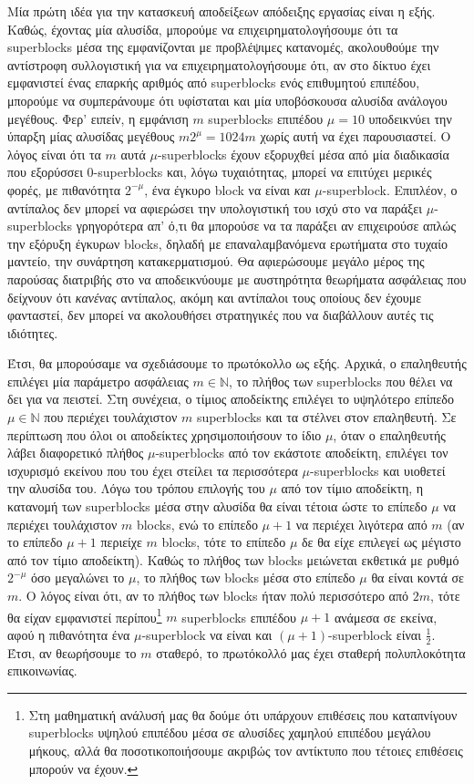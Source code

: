 Μία πρώτη ιδέα για την κατασκευή αποδείξεων απόδειξης εργασίας είναι η εξής. Καθώς, έχοντας μία αλυσίδα,
μπορούμε να επιχειρηματολογήσουμε ότι τα superblocks μέσα της εμφανίζονται με προβλέψιμες κατανομές,
ακολουθούμε την αντίστροφη συλλογιστική για να επιχειρηματολογήσουμε ότι, αν στο δίκτυο έχει εμφανιστεί
ένας επαρκής αριθμός από superblocks ενός επιθυμητού επιπέδου, μπορούμε να συμπεράνουμε ότι υφίσταται
και μία υποβόσκουσα αλυσίδα ανάλογου μεγέθους. Φερ' ειπείν, η εμφάνιση $m$ superblocks επιπέδου $\mu = 10$
υποδεικνύει την ύπαρξη μίας αλυσίδας μεγέθους $m 2^\mu = 1024m$ χωρίς αυτή να έχει παρουσιαστεί. Ο λόγος είναι ότι
τα $m$ αυτά $\mu$-superblocks έχουν εξορυχθεί μέσα από μία διαδικασία που εξορύσσει $0$-superblocks και,
λόγω τυχαιότητας, μπορεί να επιτύχει μερικές φορές, με πιθανότητα $2^{-\mu}$, ένα έγκυρο block να είναι \emph{και}
$\mu$-superblock. Επιπλέον, ο αντίπαλος δεν μπορεί να αφιερώσει την υπολογιστική του ισχύ στο να παράξει
$\mu$-superblocks γρηγορότερα απ' ό,τι θα μπορούσε να τα παράξει αν επιχειρούσε απλώς την εξόρυξη έγκυρων
blocks, δηλαδή με επαναλαμβανόμενα ερωτήματα στο τυχαίο μαντείο, την συνάρτηση κατακερματισμού. Θα
αφιερώσουμε μεγάλο μέρος της παρούσας διατριβής στο να αποδεικνύουμε με αυστηρότητα θεωρήματα ασφάλειας που δείχνουν
ότι \emph{κανένας} αντίπαλος, ακόμη και αντίπαλοι τους οποίους δεν έχουμε φανταστεί, δεν μπορεί να
ακολουθήσει στρατηγικές που να διαβάλλουν αυτές τις ιδιότητες.

Έτσι, θα μπορούσαμε να σχεδιάσουμε το πρωτόκολλο ως εξής. Αρχικά, ο επαληθευτής επιλέγει μία παράμετρο
ασφάλειας $m \in \mathbb{N}$, το πλήθος των superblocks που θέλει να δει για να πειστεί. Στη συνέχεια,
ο τίμιος αποδείκτης επιλέγει το υψηλότερο επίπεδο $\mu \in \mathbb{N}$ που περιέχει τουλάχιστον $m$
superblocks και τα στέλνει στον επαληθευτή. Σε περίπτωση που όλοι οι αποδείκτες χρησιμοποιήσουν το
ίδιο $\mu$, όταν ο επαληθευτής λάβει διαφορετικό πλήθος $\mu$-superblocks
από τον εκάστοτε αποδείκτη, επιλέγει τον ισχυρισμό εκείνου που του έχει στείλει
τα περισσότερα $\mu$-superblocks και υιοθετεί την αλυσίδα του. Λόγω του τρόπου επιλογής του $\mu$
από τον τίμιο αποδείκτη,
η κατανομή των superblocks μέσα στην αλυσίδα θα είναι τέτοια
ώστε το επίπεδο $\mu$ να περιέχει τουλάχιστον $m$ blocks, ενώ το επίπεδο $\mu + 1$ να περιέχει
λιγότερα από $m$ (αν το επίπεδο $\mu+1$ περιείχε $m$ blocks, τότε το επίπεδο $\mu$ δε θα είχε
επιλεγεί ως μέγιστο από τον τίμιο αποδείκτη). Καθώς το πλήθος των blocks μειώνεται εκθετικά
με ρυθμό $2^{-\mu}$ όσο μεγαλώνει το $\mu$, το πλήθος των blocks μέσα στο επίπεδο $\mu$ θα
είναι κοντά σε $m$. Ο λόγος είναι ότι, αν το πλήθος των blocks ήταν πολύ περισσότερο από $2m$,
τότε θα είχαν εμφανιστεί περίπου\footnote{Στη μαθηματική ανάλυσή μας θα δούμε ότι υπάρχουν επιθέσεις
που καταπνίγουν superblocks υψηλού επιπέδου μέσα σε αλυσίδες χαμηλού επιπέδου μεγάλου μήκους, αλλά
θα ποσοτικοποιήσουμε ακριβώς τον αντίκτυπο που τέτοιες επιθέσεις μπορούν να έχουν.}
$m$ superblocks επιπέδου $\mu+1$ ανάμεσα σε εκείνα, αφού η πιθανότητα
ένα $\mu$-superblock να είναι και $(\mu + 1)$-superblock είναι $\frac{1}{2}$. Έτσι, αν θεωρήσουμε
το $m$ σταθερό, το πρωτόκολλό μας έχει σταθερή πολυπλοκότητα επικοινωνίας.

